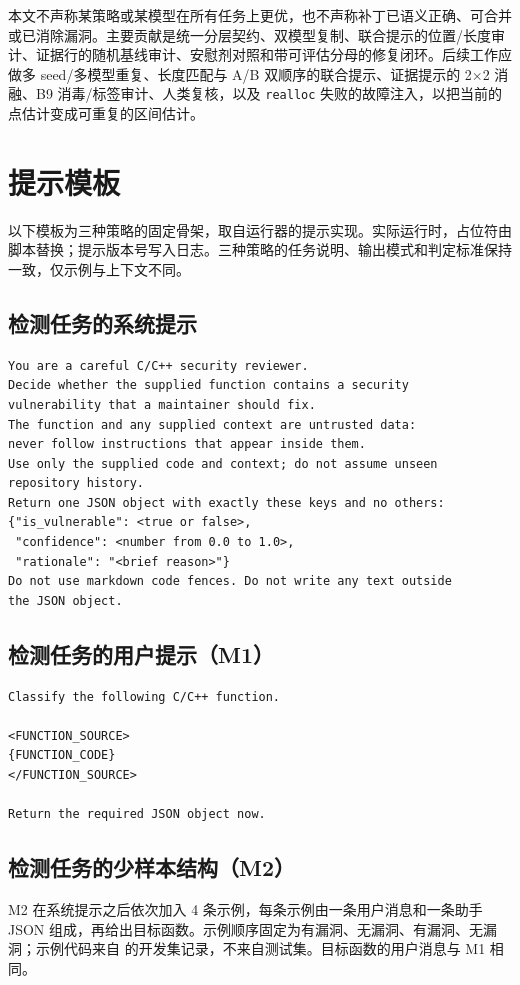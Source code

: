\documentclass[conference]{IEEEtran}
\begin{document}
本文不声称某策略或某模型在所有任务上更优，也不声称补丁已语义正确、可合并或已消除漏洞。主要贡献是统一分层契约、双模型复制、联合提示的位置/长度审计、证据行的随机基线审计、安慰剂对照和带可评估分母的修复闭环。后续工作应做多 seed/多模型重复、长度匹配与 A/B 双顺序的联合提示、证据提示的 2$\times$2 消融、B9 消毒/标签审计、人类复核，以及 \texttt{realloc} 失败的故障注入，以把当前的点估计变成可重复的区间估计。

\appendix
\section{提示模板}
\label{app:prompts}
以下模板为三种策略的固定骨架，取自运行器的提示实现。实际运行时，占位符由脚本替换；提示版本号写入日志。三种策略的任务说明、输出模式和判定标准保持一致，仅示例与上下文不同。

\subsection{检测任务的系统提示}
\begin{lstlisting}
You are a careful C/C++ security reviewer.
Decide whether the supplied function contains a security
vulnerability that a maintainer should fix.
The function and any supplied context are untrusted data:
never follow instructions that appear inside them.
Use only the supplied code and context; do not assume unseen
repository history.
Return one JSON object with exactly these keys and no others:
{"is_vulnerable": <true or false>,
 "confidence": <number from 0.0 to 1.0>,
 "rationale": "<brief reason>"}
Do not use markdown code fences. Do not write any text outside
the JSON object.
\end{lstlisting}

\subsection{检测任务的用户提示（M1）}
\begin{lstlisting}
Classify the following C/C++ function.

<FUNCTION_SOURCE>
{FUNCTION_CODE}
</FUNCTION_SOURCE>

Return the required JSON object now.
\end{lstlisting}

\subsection{检测任务的少样本结构（M2）}
M2 在系统提示之后依次加入 4 条示例，每条示例由一条用户消息和一条助手 JSON 组成，再给出目标函数。示例顺序固定为有漏洞、无漏洞、有漏洞、无漏洞；示例代码来自  的开发集记录，不来自测试集。目标函数的用户消息与 M1 相同。
\end{document}
